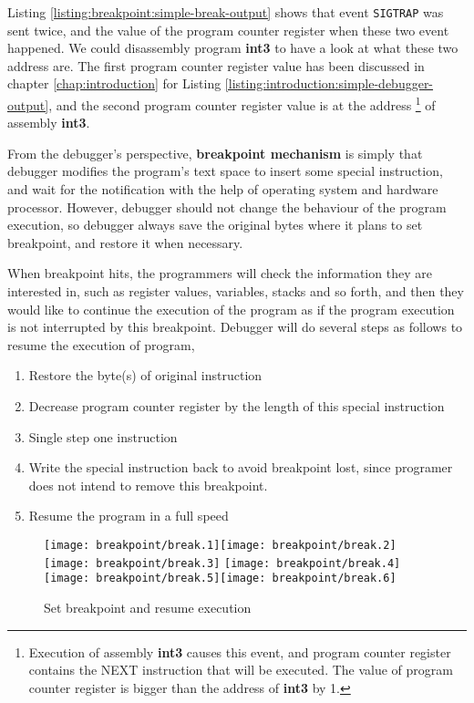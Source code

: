 \documentclass[12pt]{book}
\begin{document}
\begin{CJK}{UTF8}{gbsn}
Listing \ref{listing:breakpoint:simple-break-output} shows that event \texttt{SIGTRAP} was sent twice, 
and the value of the program counter register when these two event happened.  
We could disassembly program \textbf{int3} to have a look at what these two address are.  The first program counter register value has been discussed in chapter 
\ref{chap:introduction} for Listing \ref{listing:introduction:simple-debugger-output}, 
and the second program counter register value is at the address
\footnote{Execution of assembly \textbf{int3} causes this event, and program counter register contains the NEXT instruction that will be executed.
The value of program counter register is bigger than the address of \textbf{int3} by 1.} of assembly \textbf{int3}.



From the debugger's perspective, \textbf{breakpoint mechanism} is simply that 
debugger modifies the program's text space to insert some special instruction, 
and wait for the notification with the help of operating system and hardware processor.
However, debugger should not change the behaviour of the program execution, 
so debugger always save the original bytes
where it plans to set breakpoint, and restore it when necessary.  

When breakpoint hits, the programmers will check the information they are interested in, 
such as register values, variables, stacks and so forth,
and then they would like to continue the execution of the program as if 
the program execution is not interrupted by this breakpoint.  Debugger will do several steps
as follows to resume the execution of program,

\begin{enumerate}
\item Restore the byte(s) of original instruction
\item Decrease program counter register by the length of this special instruction
\item Single step one instruction
\item Write the special instruction back to avoid breakpoint lost, 
since programer does not intend to remove this breakpoint.
\item Resume the program in a full speed
\end{enumerate}

\begin{figure}[htb]
  \centering
  \texttt{[image: breakpoint/break.1]}\hfill\texttt{[image: breakpoint/break.2]}\hfill\texttt{[image: breakpoint/break.3]}\hfill
  \texttt{[image: breakpoint/break.4]}\hfill\texttt{[image: breakpoint/break.5]}\hfill\texttt{[image: breakpoint/break.6]}
  \caption{Set breakpoint and resume execution}
  \label{fig:break}
\end{figure}


\end{CJK}
\end{document}

